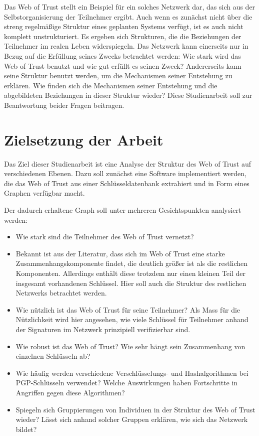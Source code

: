 Das Web of Trust stellt ein Beispiel für ein solches Netzwerk dar,
das sich aus der Selbstorganisierung der Teilnehmer ergibt. Auch wenn
es zunächst nicht über die streng regelmäßige Struktur eines
geplanten Systems verfügt, ist es auch nicht komplett
unstrukturiert. Es ergeben sich Strukturen, die die Beziehungen der
Teilnehmer im realen Leben widerspiegeln. Das Netzwerk kann
einerseits nur in Bezug auf die Erfüllung seines Zwecks betrachtet
werden: Wie stark wird das Web of Trust benutzt und wie gut erfüllt
es seinen Zweck? Andererseits kann seine Struktur benutzt werden, um
die Mechanismen seiner Entstehung zu erklären. Wie finden sich die
Mechanismen seiner Entstehung und die abgebildeten Beziehungen in
dieser Struktur wieder? Diese Studienarbeit soll zur Beantwortung beider Fragen beitragen.


\section{Zielsetzung der Arbeit}
\label{ch:Einleitung:sec:Zielsetzung}

Das Ziel dieser Studienarbeit ist eine Analyse der Struktur des Web of
Trust auf verschiedenen Ebenen. Dazu soll zunächst eine Software
implementiert werden, die das Web of Trust aus einer
Schlüsseldatenbank extrahiert und in Form eines Graphen verfügbar
macht. 

Der dadurch erhaltene Graph soll unter mehreren Gesichtspunkten
analysiert werden:

\begin{itemize}

\item Wie stark sind die Teilnehmer des Web of Trust vernetzt?

\item Bekannt ist aus der Literatur, dass sich im Web of Trust eine starke
  Zusammenhangskomponente findet, die deutlich gr\"o{\ss}er ist als
  die restlichen Komponenten. Allerdings enth\"alt diese trotzdem nur
  einen kleinen Teil der insgesamt vorhandenen Schl\"ussel. Hier soll
  auch die Struktur des restlichen Netzwerks betrachtet werden.

\item  Wie nützlich ist das Web of Trust für seine Teilnehmer? Als
  Mass für die Nützlichkeit wird hier angesehen, wie viele
  Schlüssel für Teilnehmer anhand der Signaturen im Netzwerk
  prinzipiell verifizierbar sind.

\item Wie robust ist das Web of Trust? Wie sehr hängt sein
  Zusammenhang von einzelnen Schlüsseln ab?

\item Wie häufig werden verschiedene Verschlüsselungs- und
  Hashalgorithmen bei PGP-Schlüsseln verwendet? Welche Auswirkungen
  haben Fortschritte in Angriffen gegen diese Algorithmen?

\item Spiegeln sich Gruppierungen von Individuen in der Struktur des
  Web of Trust wieder? Lässt sich anhand solcher Gruppen erklären,
  wie sich das Netzwerk bildet?
\end{itemize}

